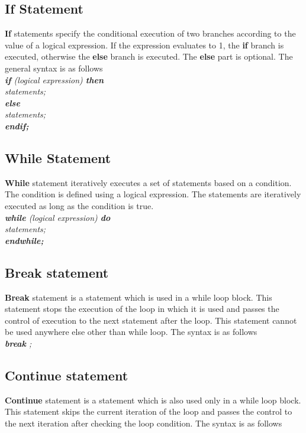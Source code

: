 \subsection{If Statement}
\textbf{If} statements specify the conditional execution of two branches according to the value of a logical expression. If the expression evaluates to 1, the \textbf{if} branch is executed, otherwise the \textbf{else}  branch is executed. The \textbf{else} part is optional. The general syntax is as follows  \\

\textit{
\textbf{if} (logical expression) \textbf{then}  \\
 \indent \indent statements; \\
\indent \textbf{else} \\
\indent  \indent statements; \\
\indent \textbf{endif;}  \\
}



\subsection{While Statement}
\textbf{While} statement iteratively executes a set of statements based on a condition. The condition is defined using a logical expression.  The statements are iteratively executed as long as the condition is true.\\

\textit{
\textbf{while} (logical expression) \textbf{do}  \\
 \indent \indent statements; \\
\indent \textbf{endwhile;}  \\
}


\subsection{Break statement}
\textbf{Break} statement is a statement which is used in a while loop block. This statement stops the execution of the loop in which it is used and passes the control of execution to the next statement after the loop. This statement cannot be used anywhere else other than while loop. The syntax is as follows\\

\textit{\textbf{break} ;}


\subsection{Continue statement}
\textbf{Continue} statement is a statement which is also used only in a while loop block. This statement skips the current iteration of the loop and passes the control to the next iteration after checking the loop condition. The syntax is as follows\\

